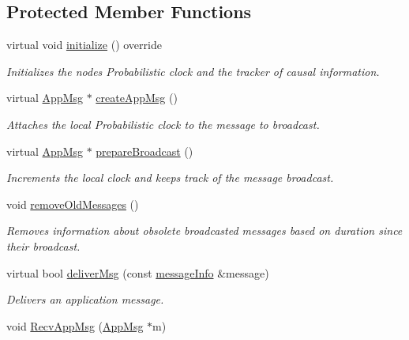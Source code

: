 \subsection*{Protected Member Functions}
\begin{DoxyCompactItemize}
\item 
virtual void \hyperlink{class_node_with_control_a08c8e80fd67b52c51c642d7c66fe729c}{initialize} () override
\begin{DoxyCompactList}\small\item\em Initializes the nodes Probabilistic clock and the tracker of causal information. \end{DoxyCompactList}\item 
virtual \hyperlink{class_app_msg}{App\+Msg} $\ast$ \hyperlink{class_node_with_control_a7772568c2836f5f204952ebe659e0049}{create\+App\+Msg} ()
\begin{DoxyCompactList}\small\item\em Attaches the local Probabilistic clock to the message to broadcast. \end{DoxyCompactList}\item 
virtual \hyperlink{class_app_msg}{App\+Msg} $\ast$ \hyperlink{class_node_with_control_ab871014cf3f42d834f8d34ad5498174c}{prepare\+Broadcast} ()
\begin{DoxyCompactList}\small\item\em Increments the local clock and keeps track of the message broadcast. \end{DoxyCompactList}\item 
void \hyperlink{class_node_with_control_add681efe156d989a717d2cd979f5ac9f}{remove\+Old\+Messages} ()
\begin{DoxyCompactList}\small\item\em Removes information about obsolete broadcasted messages based on duration since their broadcast. \end{DoxyCompactList}\item 
virtual bool \hyperlink{class_node_with_control_aada7451be61be592b27188b6249afef2}{deliver\+Msg} (const \hyperlink{structures_8h_a7e7bdc1d2fff8a9436f2f352b2711ed6}{message\+Info} \&message)
\begin{DoxyCompactList}\small\item\em Delivers an application message. \end{DoxyCompactList}\item 
void \hyperlink{class_node_with_control_ae177f5f64edcc09a3875e5afdc82edd2}{Recv\+App\+Msg} (\hyperlink{class_app_msg}{App\+Msg} $\ast$m)

\end{DoxyCompactItemize}

